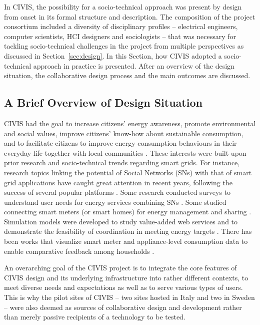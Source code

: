 In CIVIS, the possibility for a socio-technical approach was present by design from onset
in its formal structure and description.
The composition of the project consortium included a diversity of disciplinary profiles -- electrical engineers, computer scientists, HCI designers and sociologists -- that was necessary for tackling socio-technical challenges in the project from multiple perspectives as discussed in Section~\ref{sec:design}. 
% 
In this Section, how CIVIS adopted %
a socio-technical approach in practice is presented. After an overview of the design situation,
the collaborative design process and the main outcomes are discussed.

\subsection{A Brief Overview of Design Situation}

CIVIS had the goal to increase citizens' energy awareness, promote environmental and social values, improve citizens' know-how about sustainable consumption, and to facilitate citizens to improve energy consumption behaviours in their everyday life together with local communities \cite{Huang2014,Huang2015a,Huang2016}. 
These interests were built upon prior research and socio-technical trends regarding smart grids.
For instance, research topics linking the potential of Social Networks (SNs) with that of smart grid applications 
have caught great attention in recent years, following the success of several popular platforms 
\cite{Boslet2010,Chima2011,Erickson2012,Fang2013,Huang2015}. 
Some research conducted surveys to understand user needs for energy services combining SNs \cite{Silva2012}. 
Some studied connecting smart meters (or smart homes) for energy management and
sharing \cite{Ciuciu2012,Steinheimer2012}. 
Simulation models were developed to study value-added web services \cite{De-Haan2011,Lei2012,Chatzidimitriou2013} and to 
demonstrate the feasibility of coordination in meeting energy targets \cite{Worm2013,Skopik2014}.
There has been works that visualize smart meter and appliance-level consumption data to enable comparative feedback among households \cite{Petkov2011,Weiss2012,Dillahunt2014}.

An overarching goal of the CIVIS project is to integrate the core features of CIVIS design and its underlying infrastructure into rather different contexts, to meet diverse needs and expectations as well as to serve various types of users. 
This is why the pilot sites of CIVIS -- two sites hosted in Italy and two in Sweden -- were also deemed as sources of collaborative design and development rather than merely passive recipients of a technology to be tested.  

